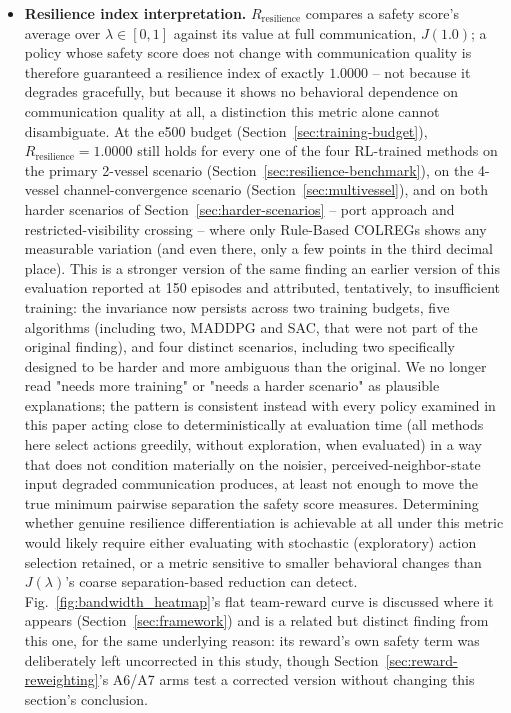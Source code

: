 \documentclass[journal,twocolumn,10pt]{IEEEtran}
\begin{document}
\begin{itemize}
evidence we previously reported for added $N_v\cdot v$/$Y_r\cdot r$ cross-coupling terms was not re-verified against the corrected test harness and should not be read as settled either way; reaching IMO compliance did not require them, so we do not revisit them here. The coefficients themselves remain a direct-simulation-search result, not a captive-model-test- or regression-derived one, so the hand-tuned-estimate caveat above still applies -- what this closes is IMO sea-trial compliance specifically, not hydrodynamic realism generally.
    \item \textbf{Resilience index interpretation.} $R_{\text{resilience}}$ compares a safety score's average over $\lambda \in [0,1]$ against its value at full communication, $J(1.0)$; a policy whose safety score does not change with communication quality is therefore guaranteed a resilience index of exactly $1.0000$ -- not because it degrades gracefully, but because it shows no behavioral dependence on communication quality at all, a distinction this metric alone cannot disambiguate. At the e500 budget (Section~\ref{sec:training-budget}), $R_{\text{resilience}} = 1.0000$ still holds for every one of the four RL-trained methods on the primary 2-vessel scenario (Section~\ref{sec:resilience-benchmark}), on the 4-vessel channel-convergence scenario (Section~\ref{sec:multivessel}), and on both harder scenarios of Section~\ref{sec:harder-scenarios} -- port approach and restricted-visibility crossing -- where only Rule-Based COLREGs shows any measurable variation (and even there, only a few points in the third decimal place). This is a stronger version of the same finding an earlier version of this evaluation reported at 150 episodes and attributed, tentatively, to insufficient training: the invariance now persists across two training budgets, five algorithms (including two, MADDPG and SAC, that were not part of the original finding), and four distinct scenarios, including two specifically designed to be harder and more ambiguous than the original. We no longer read "needs more training" or "needs a harder scenario" as plausible explanations; the pattern is consistent instead with every policy examined in this paper acting close to deterministically at evaluation time (all methods here select actions greedily, without exploration, when evaluated) in a way that does not condition materially on the noisier, perceived-neighbor-state input degraded communication produces, at least not enough to move the true minimum pairwise separation the safety score measures. Determining whether genuine resilience differentiation is achievable at all under this metric would likely require either evaluating with stochastic (exploratory) action selection retained, or a metric sensitive to smaller behavioral changes than $J(\lambda)$'s coarse separation-based reduction can detect. Fig.~\ref{fig:bandwidth_heatmap}'s flat team-reward curve is discussed where it appears (Section~\ref{sec:framework}) and is a related but distinct finding from this one, for the same underlying reason: its reward's own safety term was deliberately left uncorrected in this study, though Section~\ref{sec:reward-reweighting}'s A6/A7 arms test a corrected version without changing this section's conclusion.

\end{itemize}
\end{document}
